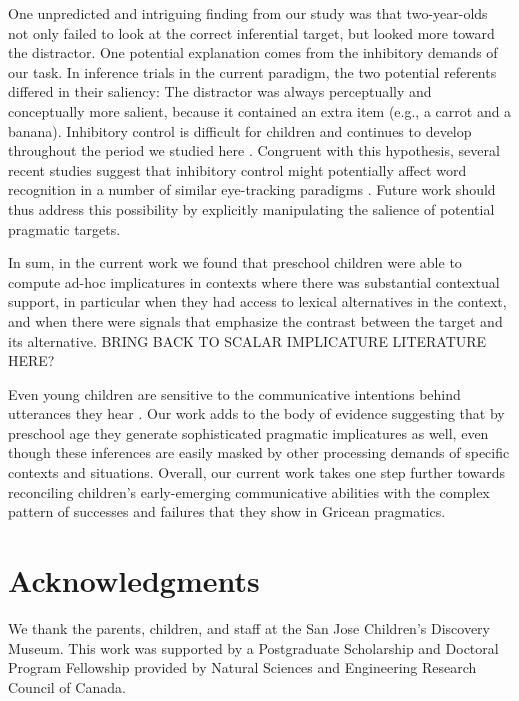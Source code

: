 \documentclass[10pt,letterpaper]{article}
\begin{document}
One unpredicted and intriguing finding from our study was that two-year-olds not only failed to look at the correct inferential target, but looked more toward the distractor. One potential explanation comes from the inhibitory demands of our task. In inference trials in the current paradigm, the two potential referents differed in their saliency: The distractor was always perceptually and conceptually more salient, because it contained an extra item (e.g., a carrot and a banana). Inhibitory control is difficult for children and continues to develop throughout the period we studied here \cite{davidson2006development, gerardi2000sensitivity}. Congruent with this hypothesis, several recent studies suggest that inhibitory control might potentially affect word recognition in a number of similar eye-tracking paradigms \cite{yurovskybeyond,nordmeyer2013measuring}. Future work should thus address this possibility by explicitly manipulating the salience of potential pragmatic targets.

In sum, in the current work we found that preschool children were able to compute ad-hoc implicatures in contexts where there was substantial contextual support, in particular when they had access to lexical alternatives in the context, and when there were signals that emphasize the contrast between the target and its alternative. BRING BACK TO SCALAR IMPLICATURE LITERATURE HERE?

Even young children are sensitive to the communicative intentions behind utterances they hear \cite{clark2009first,baldwin1993early}. Our work adds to the body of evidence suggesting that by preschool age they generate sophisticated pragmatic implicatures as well, even though these inferences are easily masked by other processing demands of specific contexts and situations. Overall, our current work takes one step further towards reconciling children's early-emerging communicative abilities with the complex pattern of successes and failures that they show in Gricean pragmatics.

\section{Acknowledgments}

We thank the parents, children, and staff at the San Jose Children's Discovery Museum. This work was supported by a Postgraduate Scholarship and Doctoral Program Fellowship provided by Natural Sciences and Engineering Research Council of Canada.



\setlength{\bibleftmargin}{.125in}
\setlength{\bibindent}{-\bibleftmargin}


\end{document}
